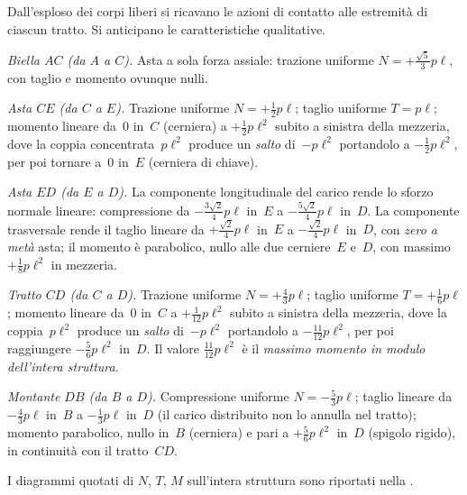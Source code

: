 Dall'esploso dei corpi liberi si ricavano le azioni di
contatto alle estremità di ciascun tratto. Si anticipano le
caratteristiche qualitative.

\medskip
\noindent\textit{Biella $AC$ (da $A$ a $C$).}
Asta a sola forza assiale: trazione uniforme
$N = +\tfrac{\sqrt5}{3}p\ell$, con taglio e momento ovunque
nulli.

\medskip
\noindent\textit{Asta $CE$ (da $C$ a $E$).}
Trazione uniforme $N = +\tfrac12 p\ell$; taglio uniforme
$T = p\ell$; momento lineare da~$0$ in~$C$ (cerniera) a
$+\tfrac12 p\ell^2$ subito a sinistra della mezzeria, dove
la coppia concentrata~$p\ell^2$ produce un \emph{salto}
di~$-p\ell^2$ portandolo a $-\tfrac12 p\ell^2$, per poi
tornare a~$0$ in~$E$ (cerniera di chiave).

\medskip
\noindent\textit{Asta $ED$ (da $E$ a $D$).}
La componente longitudinale del carico rende lo sforzo
normale lineare: compressione da $-\tfrac{3\sqrt2}{4}p\ell$
in~$E$ a $-\tfrac{5\sqrt2}{4}p\ell$ in~$D$. La componente
trasversale rende il taglio lineare da $+\tfrac{\sqrt2}{4}p\ell$
in~$E$ a $-\tfrac{\sqrt2}{4}p\ell$ in~$D$, con \emph{zero a
	metà} asta; il momento è parabolico, nullo alle due
cerniere~$E$ e~$D$, con massimo $+\tfrac18 p\ell^2$ in
mezzeria.

\medskip
\noindent\textit{Tratto $CD$ (da $C$ a $D$).}
Trazione uniforme $N = +\tfrac43 p\ell$; taglio uniforme
$T = +\tfrac16 p\ell$; momento lineare da~$0$ in~$C$ a
$+\tfrac{1}{12}p\ell^2$ subito a sinistra della mezzeria,
dove la coppia~$p\ell^2$ produce un \emph{salto} di~$-p\ell^2$
portandolo a $-\tfrac{11}{12}p\ell^2$, per poi raggiungere
$-\tfrac56 p\ell^2$ in~$D$. Il valore $\tfrac{11}{12}p\ell^2$
è il \emph{massimo momento in modulo dell'intera struttura}.

\medskip
\noindent\textit{Montante $DB$ (da $B$ a $D$).}
Compressione uniforme $N = -\tfrac53 p\ell$; taglio lineare
da $-\tfrac43 p\ell$ in~$B$ a $-\tfrac13 p\ell$ in~$D$ (il
carico distribuito non lo annulla nel tratto); momento
parabolico, nullo in~$B$ (cerniera) e pari a $+\tfrac56 p\ell^2$
in~$D$ (spigolo rigido), in continuità con il tratto~$CD$.


I diagrammi quotati di $N$, $T$, $M$ sull'intera struttura
sono riportati nella .




